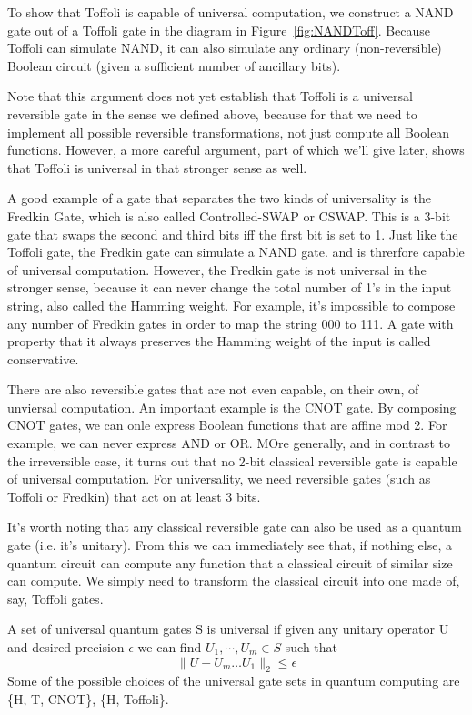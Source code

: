 To show that Toffoli is capable of universal computation, we construct a NAND gate out of a Toffoli gate in the diagram in Figure~\ref{fig:NANDToff}. Because Toffoli can simulate NAND, it can also simulate any ordinary (non-reversible) Boolean circuit (given a sufficient number of ancillary bits).

Note that this argument does not yet establish that Toffoli is a universal reversible gate in the sense we defined above, because for that we need to implement all possible reversible transformations, not just compute all Boolean functions. However, a more careful argument, part of which we'll give later, shows that Toffoli is universal in that stronger sense as well.

A good example of a gate that separates the two kinds of universality is the Fredkin Gate, which is also called Controlled-SWAP or CSWAP. This is a 3-bit gate that swaps the second and third bits iff the first bit is set to 1. Just like the Toffoli gate, the Fredkin gate can simulate a NAND gate. and is threrfore capable of universal computation. However, the Fredkin gate is not universal in the stronger sense, because it can never change the total number of 1's in the input string, also called the Hamming weight. For example, it's impossible to compose any number of Fredkin gates in order to map the string 000 to 111. A gate with property that it always preserves the Hamming weight of the input is called conservative.

There are also reversible gates that are not even capable, on their own, of unviersal computation. An important example is the CNOT gate. By composing CNOT gates, we can onle express Boolean functions that are affine mod 2. For example, we can never express AND or OR. MOre generally, and in contrast to the irreversible case, it turns out that no 2-bit classical reversible gate is capable of universal computation. For universality, we need reversible gates (such as Toffoli or Fredkin) that act on at least 3 bits.

It's worth noting that any classical reversible gate can also be used as a quantum gate (i.e. it's unitary). From this we can immediately see that, if nothing else, a quantum circuit can compute any function that a classical circuit of similar size can compute. We simply need to transform the classical circuit into one made of, say, Toffoli gates.

\begin{definition}
A set of universal quantum gates S is universal if given any unitary operator U and desired precision $\epsilon$ we can find $U_1,\cdots, U_m \in S$ such that
\[\|U-U_m\ldots U_1\|_2 \leq \epsilon\]    
Some of the possible choices of the universal gate sets in quantum computing are \{H, T, CNOT\}, \{H, Toffoli\}.
\end{definition}

